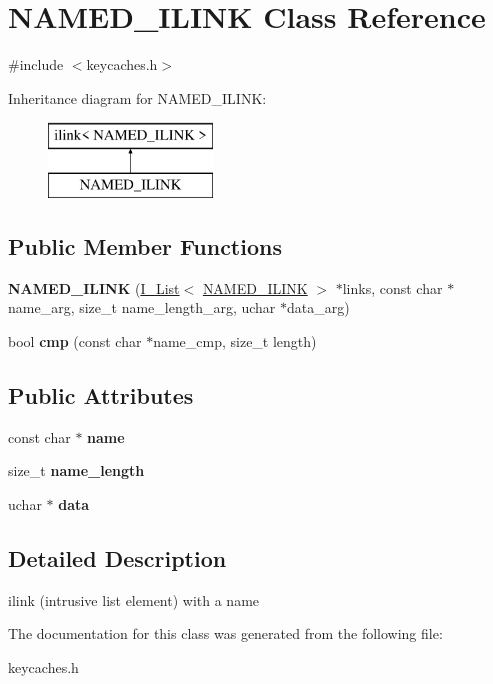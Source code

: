 \hypertarget{classNAMED__ILINK}{}\section{N\+A\+M\+E\+D\+\_\+\+I\+L\+I\+NK Class Reference}
\label{classNAMED__ILINK}


{\ttfamily \#include $<$keycaches.\+h$>$}

Inheritance diagram for N\+A\+M\+E\+D\+\_\+\+I\+L\+I\+NK\+:\begin{figure}[H]
\begin{center}
\leavevmode
\includegraphics[height=2.000000cm]{classNAMED__ILINK}
\end{center}
\end{figure}
\subsection*{Public Member Functions}
\begin{DoxyCompactItemize}
\item 
\mbox{\label{classNAMED__ILINK_a2201994688f9fec2128b6b8c6688768c}} 
{\bfseries N\+A\+M\+E\+D\+\_\+\+I\+L\+I\+NK} (\mbox{\hyperlink{classI__List}{I\+\_\+\+List}}$<$ \mbox{\hyperlink{classNAMED__ILINK}{N\+A\+M\+E\+D\+\_\+\+I\+L\+I\+NK}} $>$ $\ast$links, const char $\ast$name\+\_\+arg, size\+\_\+t name\+\_\+length\+\_\+arg, uchar $\ast$data\+\_\+arg)
\item 
\mbox{\label{classNAMED__ILINK_a18f6e545d04868c3483665c5293448dc}} 
bool {\bfseries cmp} (const char $\ast$name\+\_\+cmp, size\+\_\+t length)
\end{DoxyCompactItemize}
\subsection*{Public Attributes}
\begin{DoxyCompactItemize}
\item 
\mbox{\label{classNAMED__ILINK_a29b42751520a1ebd453feede0345c1ac}} 
const char $\ast$ {\bfseries name}
\item 
\mbox{\label{classNAMED__ILINK_ae965850868f5977b0264615c6cf0d1f1}} 
size\+\_\+t {\bfseries name\+\_\+length}
\item 
\mbox{\label{classNAMED__ILINK_ac448d7245d6fe6554a8ce91277e15812}} 
uchar $\ast$ {\bfseries data}
\end{DoxyCompactItemize}


\subsection{Detailed Description}
ilink (intrusive list element) with a name 

The documentation for this class was generated from the following file\+:\begin{DoxyCompactItemize}
\item 
keycaches.\+h\end{DoxyCompactItemize}
